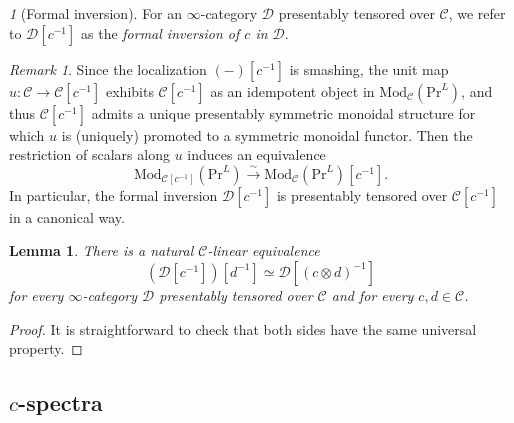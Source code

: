 \documentclass{amsart}
\theoremstyle{plain}
\newtheorem{lemma}[theorem]{Lemma}
\theoremstyle{definition}
\theoremstyle{remark}
\newtheorem{remark}[theorem]{Remark}
\newtheorem{p}[theorem]{}
\numberwithin{equation}{theorem}
\newcommand{\mcal}[1]{\mathcal{#1}}
\newcommand{\Mod}{\mathrm{Mod}}
\renewcommand{\Pr}{\mathrm{Pr}}
\begin{document}
\begin{p}[Formal inversion]
For an $\infty$-category $\mcal{D}$ presentably tensored over $\mcal{C}$, we refer to $\mcal{D}[c^{-1}]$ as the \textit{formal inversion of $c$ in $\mcal{D}$}.
\end{p}

\begin{remark}
Since the localization $(-)[c^{-1}]$ is smashing, the unit map $u\colon\mcal{C}\to\mcal{C}[c^{-1}]$ exhibits $\mcal{C}[c^{-1}]$ as an idempotent object in $\Mod_\mcal{C}(\Pr^L)$, and thus $\mcal{C}[c^{-1}]$ admits a unique presentably symmetric monoidal structure for which $u$ is (uniquely) promoted to a symmetric monoidal functor.
Then the restriction of scalars along $u$ induces an equivalence
\[
	\Mod_{\mcal{C}[c^{-1}]}(\Pr^L) \xrightarrow{\sim} \Mod_\mcal{C}(\Pr^L)[c^{-1}].
\]
In particular, the formal inversion $\mcal{D}[c^{-1}]$ is presentably tensored over $\mcal{C}[c^{-1}]$ in a canonical way.
\end{remark}

\begin{lemma}\label{lem:Inv}
There is a natural $\mcal{C}$-linear equivalence
\[
	(\mcal{D}[c^{-1}])[d^{-1}] \simeq \mcal{D}[(c\otimes d)^{-1}]
\]
for every $\infty$-category $\mcal{D}$ presentably tensored over $\mcal{C}$ and for every $c,d\in\mcal{C}$.
\end{lemma}
\begin{proof}
It is straightforward to check that both sides have the same universal property.
\end{proof}


\subsection{$c$-spectra}\label{cSp}
\end{document}
